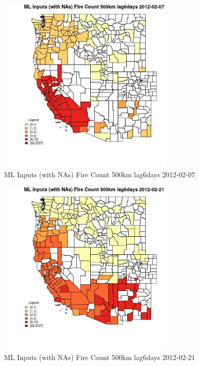 \begin{figure} 
\centering  
\includegraphics[width=0.77\textwidth]{Code_Outputs/Report_ML_input_PM25_Step4_part_f_de_duplicated_aveswNAs_CountyFire_Count_500km_lag6daysMean2012-02-07.jpg} 
\caption{\label{fig:Report_ML_input_PM25_Step4_part_f_de_duplicated_aveswNAsCountyFire_Count_500km_lag6daysMean2012-02-07}ML Inputs (with NAs) Fire Count 500km lag6days 2012-02-07} 
\end{figure} 
 

\begin{figure} 
\centering  
\includegraphics[width=0.77\textwidth]{Code_Outputs/Report_ML_input_PM25_Step4_part_f_de_duplicated_aveswNAs_CountyFire_Count_500km_lag6daysMean2012-02-21.jpg} 
\caption{\label{fig:Report_ML_input_PM25_Step4_part_f_de_duplicated_aveswNAsCountyFire_Count_500km_lag6daysMean2012-02-21}ML Inputs (with NAs) Fire Count 500km lag6days 2012-02-21} 
\end{figure} 
 

